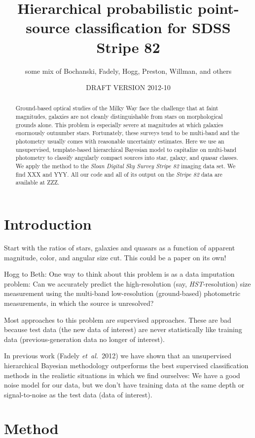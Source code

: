 \documentclass[12pt]{article}
\title{Hierarchical probabilistic point-source classification for SDSS Stripe 82}
\author{some mix of Bochanski, Fadely, Hogg, Preston, Willman, and others}
\date{DRAFT VERSION 2012-10}
\newcommand{\project}[1]{\textsl{#1}}
\newcommand{\foreign}[1]{\textsl{#1}}
\newcommand{\etal}{\foreign{et~al.}}
\begin{document}
\maketitle

\begin{abstract}
Ground-based optical studies of the Milky Way face the challenge that
at faint magnitudes, galaxies are not cleanly distinguishable from
stars on morphological grounds alone.  This problem is especially
severe at magnitudes at which galaxies enormously outnumber stars.
Fortunately, these surveys tend to be multi-band and the photometry
usually comes with reasonable uncertainty estimates.  Here we use an
unsupervised, template-based hierarchical Bayesian model to capitalize
on multi-band photometry to classify angularly compact sources into
star, galaxy, and quasar classes.  We apply the method to the
\project{Sloan Digital Sky Survey Stripe 82} imaging data set.  We
find XXX and YYY.  All our code and all of its output on the
\project{Stripe 82} data are available at ZZZ.
\end{abstract}

\section{Introduction}

Start with the ratios of stars, galaxies and quasars as a function of
apparent magnitude, color, and angular size cut.  This could be a
paper on its own!

Hogg to Beth: One way to think about this problem is as a data
imputation problem: Can we accurately predict the high-resolution
(say, \project{HST}-resolution) size measurement using the multi-band
low-resolution (ground-based) photometric measurements, in which the
source is unresolved?

Most approaches to this problem are supervised approaches.  These are
bad because test data (the new data of interest) are never
statistically like training data (previous-generation data no longer
of interest).

In previous work (Fadely \etal\ 2012) we have shown that an
unsupervised hierarchical Bayesian methodology outperforms the best
supervised classification methods in the realistic situations in which
we find ourselves: We have a good noise model for our data, but we
don't have training data at the same depth or signal-to-noise as the
test data (data of interest).

\section{Method}
\end{document}
